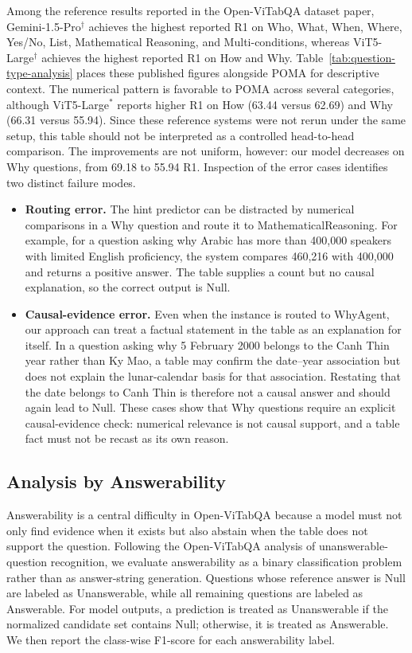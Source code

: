 \documentclass[]{interact}
\begin{document}
Among the reference results reported in the Open-ViTabQA dataset paper, Gemini-1.5-Pro$^{\dagger}$ achieves the highest reported R1 on Who, What, When, Where, Yes/No, List, Mathematical Reasoning, and Multi-conditions, whereas ViT5-Large$^{\dagger}$ achieves the highest reported R1 on How and Why. Table~\ref{tab:question-type-analysis} places these published figures alongside POMA for descriptive context. The numerical pattern is favorable to POMA across several categories, although ViT5-Large$^{*}$ reports higher R1 on How (63.44 versus 62.69) and Why (66.31 versus 55.94). Since these reference systems were not rerun under the same setup, this table should not be interpreted as a controlled head-to-head comparison. The improvements are not uniform, however: our model decreases on Why questions, from 69.18 to 55.94 R1. Inspection of the error cases identifies two distinct failure modes.

\begin{itemize}
    \item \textbf{Routing error.} The hint predictor can be distracted by numerical comparisons in a Why question and route it to MathematicalReasoning. For example, for a question asking why Arabic has more than 400,000 speakers with limited English proficiency, the system compares 460,216 with 400,000 and returns a positive answer. The table supplies a count but no causal explanation, so the correct output is Null.
    \item \textbf{Causal-evidence error.} Even when the instance is routed to WhyAgent, our approach can treat a factual statement in the table as an explanation for itself. In a question asking why 5 February 2000 belongs to the Canh Thin year rather than Ky Mao, a table may confirm the date--year association but does not explain the lunar-calendar basis for that association. Restating that the date belongs to Canh Thin is therefore not a causal answer and should again lead to Null. These cases show that Why questions require an explicit causal-evidence check: numerical relevance is not causal support, and a table fact must not be recast as its own reason.

\end{itemize}


\subsection{Analysis by Answerability}

Answerability is a central difficulty in Open-ViTabQA because a model must not only find evidence when it exists but also abstain when the table does not support the question. Following the Open-ViTabQA analysis of unanswerable-question recognition, we evaluate answerability as a binary classification problem rather than as answer-string generation. Questions whose reference answer is Null are labeled as Unanswerable, while all remaining questions are labeled as Answerable. For model outputs, a prediction is treated as Unanswerable if the normalized candidate set contains Null; otherwise, it is treated as Answerable. We then report the class-wise F1-score for each answerability label.
\end{document}
